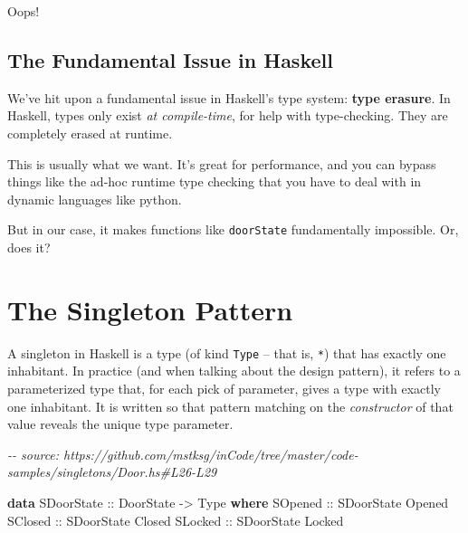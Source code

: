 \documentclass[]{article}
\newenvironment{Shaded}{}{}
\newcommand{\CommentTok}[1]{\textcolor[rgb]{0.38,0.63,0.69}{\textit{#1}}}
\newcommand{\DataTypeTok}[1]{\textcolor[rgb]{0.56,0.13,0.00}{#1}}
\newcommand{\KeywordTok}[1]{\textcolor[rgb]{0.00,0.44,0.13}{\textbf{#1}}}
\newcommand{\OtherTok}[1]{\textcolor[rgb]{0.00,0.44,0.13}{#1}}
\begin{document}
Oops!

\hypertarget{the-fundamental-issue-in-haskell}{%
\subsection{The Fundamental Issue in
Haskell}\label{the-fundamental-issue-in-haskell}}

We've hit upon a fundamental issue in Haskell's type system: \textbf{type
erasure}. In Haskell, types only exist \emph{at compile-time}, for help with
type-checking. They are completely erased at runtime.

This is usually what we want. It's great for performance, and you can bypass
things like the ad-hoc runtime type checking that you have to deal with in
dynamic languages like python.

But in our case, it makes functions like \texttt{doorState} fundamentally
impossible. Or, does it?

\hypertarget{the-singleton-pattern}{%
\section{The Singleton Pattern}\label{the-singleton-pattern}}

A singleton in Haskell is a type (of kind \texttt{Type} -- that is, \texttt{*})
that has exactly one inhabitant. In practice (and when talking about the design
pattern), it refers to a parameterized type that, for each pick of parameter,
gives a type with exactly one inhabitant. It is written so that pattern matching
on the \emph{constructor} of that value reveals the unique type parameter.

\begin{Shaded}
\begin{Highlighting}[]
\CommentTok{{-}{-} source: https://github.com/mstksg/inCode/tree/master/code{-}samples/singletons/Door.hs\#L26{-}L29}

\KeywordTok{data} \DataTypeTok{SDoorState}\OtherTok{ ::} \DataTypeTok{DoorState} \OtherTok{{-}>} \DataTypeTok{Type} \KeywordTok{where}
    \DataTypeTok{SOpened}\OtherTok{ ::} \DataTypeTok{SDoorState} \DataTypeTok{\textquotesingle{}Opened}
    \DataTypeTok{SClosed}\OtherTok{ ::} \DataTypeTok{SDoorState} \DataTypeTok{\textquotesingle{}Closed}
    \DataTypeTok{SLocked}\OtherTok{ ::} \DataTypeTok{SDoorState} \DataTypeTok{\textquotesingle{}Locked}
\end{Highlighting}
\end{Shaded}
\end{document}
